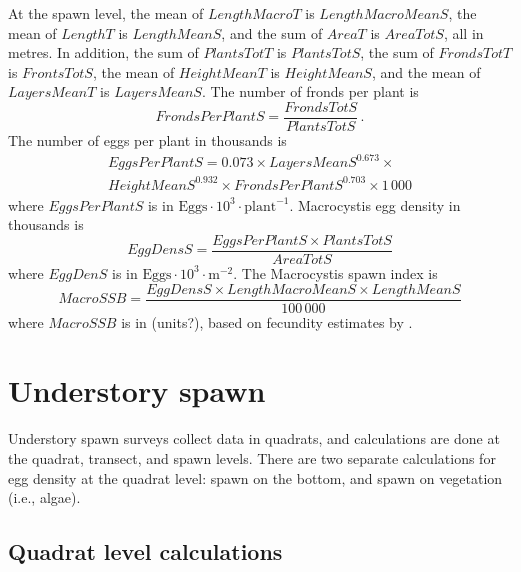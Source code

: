 \documentclass[12pt]{article}
\begin{document}
At the spawn level, the mean of $LengthMacroT$ is $LengthMacroMeanS$, the mean of $LengthT$ is $LengthMeanS$, and the sum of $AreaT$ is $AreaTotS$, all in metres.
In addition, the sum of $PlantsTotT$ is $PlantsTotS$, the sum of $FrondsTotT$ is $FrontsTotS$, the mean of $HeightMeanT$ is $HeightMeanS$, and the mean of $LayersMeanT$ is $LayersMeanS$. 
The number of fronds per plant is
\begin{equation}
FrondsPerPlantS = \frac{FrondsTotS} {PlantsTotS} \, .
\label{eqFrondsPerPlant}
\end{equation}
The number of eggs per plant in thousands is \citep{HaegeleSchweigert1990}
\begin{multline}
EggsPerPlantS = 0.073 \times LayersMeanS^{0.673} \times \\ 
HeightMeanS^{0.932} \times FrondsPerPlantS^{0.703} \times 1\,000
\label{eqEggsPerPlantMacro}
\end{multline}
where $EggsPerPlantS$ is in $\text{Eggs} \cdot 10^{3} \cdot \text{plant}^{-1}$. 
Macrocystis egg density in thousands is
\begin{equation}
EggDensS = \frac{EggsPerPlantS \times PlantsTotS} {AreaTotS}
\label{eqEggDensityMacro}
\end{equation}
where $EggDenS$ is in $\text{Eggs} \cdot 10^{3} \cdot \text{m}^{-2}$.
The Macrocystis spawn index is
\begin{equation}
MacroSSB = \frac{EggDensS \times LengthMacroMeanS \times LengthMeanS} {100\,000}
\label{eqBiomassMacro}
\end{equation}
where $MacroSSB$ is in (units?), based on fecundity estimates by \citet{Hay1985}.

\section{Understory spawn}

Understory spawn surveys collect data in quadrats, and calculations are done at the quadrat, transect, and spawn levels.
There are two separate calculations for egg density at the quadrat level: spawn on the bottom, and spawn on vegetation (i.e., algae).

\subsection{Quadrat level calculations}
\end{document}
